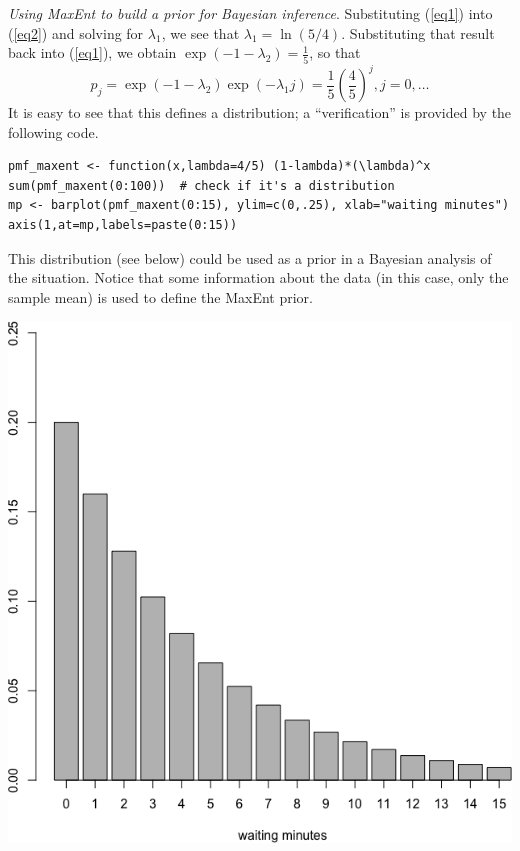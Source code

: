 \begin{Example} {\textit{Using MaxEnt to build a prior for Bayesian inference}.}
Substituting (\ref{eq1}) into (\ref{eq2}) and solving for $\lambda_1$, we see that $\lambda_1=\ln (5/4)$. Substituting that result back into (\ref{eq1}), we obtain  $\exp(-1-\lambda_2)=\frac{1}{5}$, so that  
 $$ p_j = \exp(-1-\lambda_2) \exp(-\lambda_1 j)=\frac{1}{5}\left(\frac{4}{5}\right)^j, j=0,\ldots $$
It is easy to see that this defines a distribution; a ``verification'' is provided by the following code. 
\begin{lstlisting}
pmf_maxent <- function(x,lambda=4/5) (1-lambda)*(\lambda)^x
sum(pmf_maxent(0:100))  # check if it's a distribution
mp <- barplot(pmf_maxent(0:15), ylim=c(0,.25), xlab="waiting minutes")
axis(1,at=mp,labels=paste(0:15))
\end{lstlisting}
This distribution (see below) could be used as a prior in a Bayesian analysis of the situation. Notice that some information about the data (in this case, only the sample mean) is used to define the MaxEnt prior.
\begin{center}\includegraphics[width=\linewidth]{Images/MaxEnt.png}\end{center}
\end{Example}

